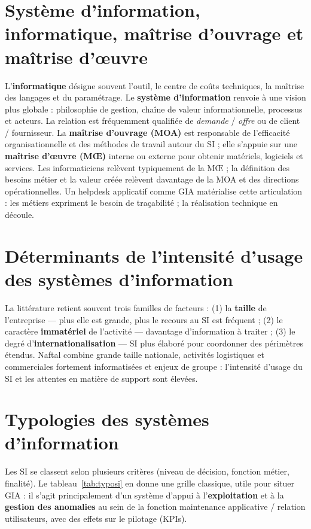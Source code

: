 \section{Système d'information, informatique, maîtrise d'ouvrage et maîtrise d'œuvre}
L'\textbf{informatique} désigne souvent l'outil, le centre de coûts techniques, la maîtrise des
langages et du paramétrage. Le \textbf{système d'information} renvoie à une vision plus globale :
philosophie de gestion, chaîne de valeur informationnelle, processus et acteurs. La relation est
fréquemment qualifiée de \emph{demande} / \emph{offre} ou de client / fournisseur. La
\textbf{maîtrise d'ouvrage (MOA)} est responsable de l'efficacité organisationnelle et des méthodes
de travail autour du SI ; elle s'appuie sur une \textbf{maîtrise d'œuvre (MŒ)} interne ou externe
pour obtenir matériels, logiciels et services. Les informaticiens relèvent typiquement de la MŒ ;
la définition des besoins métier et la valeur créée relèvent davantage de la MOA et des directions
opérationnelles. Un helpdesk applicatif comme GIA matérialise cette articulation : les métiers
expriment le besoin de traçabilité ; la réalisation technique en découle.

\section{Déterminants de l'intensité d'usage des systèmes d'information}
La littérature retient souvent trois familles de facteurs : (1) la \textbf{taille} de l'entreprise —
plus elle est grande, plus le recours au SI est fréquent ; (2) le caractère \textbf{immatériel} de
l'activité — davantage d'information à traiter ; (3) le degré d'\textbf{internationalisation} —
SI plus élaboré pour coordonner des périmètres étendus. Naftal combine grande taille nationale,
activités logistiques et commerciales fortement informatisées et enjeux de groupe : l'intensité
d'usage du SI et les attentes en matière de support sont élevées.

\section{Typologies des systèmes d'information}
Les SI se classent selon plusieurs critères (niveau de décision, fonction métier, finalité).
Le tableau~\ref{tab:typosi} en donne une grille classique, utile pour situer GIA : il s'agit
principalement d'un système d'appui à l'\textbf{exploitation} et à la \textbf{gestion des anomalies}
au sein de la fonction maintenance applicative / relation utilisateurs, avec des effets sur le
pilotage (KPIs).

